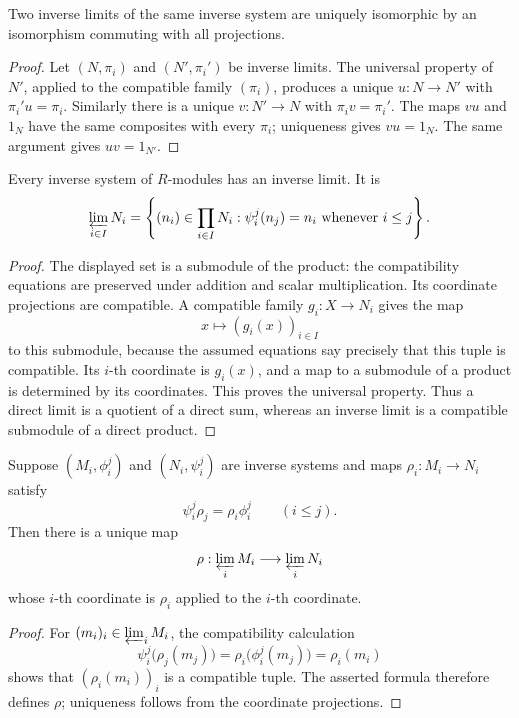 \begin{proposition}
Two inverse limits of the same inverse system are uniquely isomorphic by an
isomorphism commuting with all projections.
\end{proposition}
\begin{proof}
Let \((N,\pi_i)\) and \((N',\pi_i')\) be inverse limits.  The universal
property of \(N'\), applied to the compatible family \((\pi_i)\), produces a
unique \(u:N\to N'\) with \(\pi_i'u=\pi_i\).  Similarly there is a unique
\(v:N'\to N\) with \(\pi_iv=\pi_i'\).  The maps \(vu\) and \(1_N\) have the
same composites with every \(\pi_i\); uniqueness gives \(vu=1_N\).  The
same argument gives \(uv=1_{N'}\).
\end{proof}

\begin{proposition}
Every inverse system of \(R\)-modules has an inverse limit.  It is
\[
\varprojlim_{i\in I}N_i=
\left\{(n_i)\in\prod_{i\in I}N_i:
\psi_i^j(n_j)=n_i\text{ whenever }i\leq j\right\}.
\]
\end{proposition}
\begin{proof}
The displayed set is a submodule of the product: the compatibility equations
are preserved under addition and scalar multiplication.  Its coordinate
projections are compatible.  A compatible family \(g_i:X\to N_i\) gives the
map
\[
x\longmapsto(g_i(x))_{i\in I}
\]
to this submodule, because the assumed equations say precisely that this
tuple is compatible.  Its \(i\)-th coordinate is \(g_i(x)\), and a map to a
submodule of a product is determined by its coordinates.  This proves the
universal property.  Thus a direct limit is a quotient of a direct sum,
whereas an inverse limit is a compatible submodule of a direct product.
\end{proof}

\begin{proposition}
Suppose \((M_i,\phi_i^j)\) and \((N_i,\psi_i^j)\) are inverse systems and
maps \(\rho_i:M_i\to N_i\) satisfy
\[
\psi_i^j\rho_j=\rho_i\phi_i^j
\qquad(i\leq j).
\]
Then there is a unique map
\[
\rho:\varprojlim_iM_i\longrightarrow\varprojlim_iN_i
\]
whose \(i\)-th coordinate is \(\rho_i\) applied to the \(i\)-th coordinate.
\end{proposition}
\begin{proof}
For \((m_i)_i\in\varprojlim_iM_i\), the compatibility calculation
\[
\psi_i^j\bigl(\rho_j(m_j)\bigr)
=\rho_i\bigl(\phi_i^j(m_j)\bigr)
=\rho_i(m_i)
\]
shows that \((\rho_i(m_i))_i\) is a compatible tuple.  The asserted formula
therefore defines \(\rho\); uniqueness follows from the coordinate
projections.
\end{proof}

